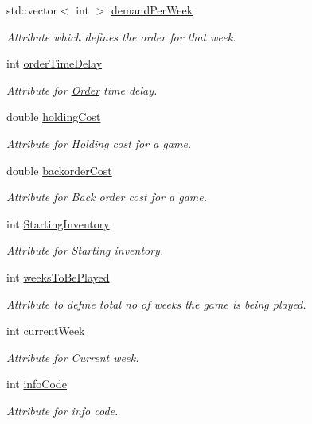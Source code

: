 \begin{DoxyCompactItemize}
std\+::vector$<$ int $>$ \hyperlink{class_game_aea9436a9a1e01665fc10fed6e8273388}{demand\+Per\+Week}
\begin{DoxyCompactList}\small\item\em Attribute which defines the order for that week. \end{DoxyCompactList}\item 
int \hyperlink{class_game_a337c34aba5afe4984d5a76e2dfb8800e}{order\+Time\+Delay}
\begin{DoxyCompactList}\small\item\em Attribute for \hyperlink{class_order}{Order} time delay. \end{DoxyCompactList}\item 
double \hyperlink{class_game_a6cb7c7d62127e8378a0dda6793916efd}{holding\+Cost}
\begin{DoxyCompactList}\small\item\em Attribute for Holding cost for a game. \end{DoxyCompactList}\item 
double \hyperlink{class_game_a413dfabbdffaf493bca059932fe09701}{backorder\+Cost}
\begin{DoxyCompactList}\small\item\em Attribute for Back order cost for a game. \end{DoxyCompactList}\item 
int \hyperlink{class_game_a903867ea1af339a759f931a726b43f0e}{Starting\+Inventory}
\begin{DoxyCompactList}\small\item\em Attribute for Starting inventory. \end{DoxyCompactList}\item 
int \hyperlink{class_game_ab577818246babc5bbd94059d33553c70}{weeks\+To\+Be\+Played}
\begin{DoxyCompactList}\small\item\em Attribute to define total no of weeks the game is being played. \end{DoxyCompactList}\item 
int \hyperlink{class_game_a271387bda026cec90a6bb370ce74278d}{current\+Week}
\begin{DoxyCompactList}\small\item\em Attribute for Current week. \end{DoxyCompactList}\item 
int \hyperlink{class_game_ac8a93c181fc5a54ca38ad59c9bff25a0}{info\+Code}
\begin{DoxyCompactList}\small\item\em Attribute for info code. \end{DoxyCompactList}\item 

\end{DoxyCompactItemize}
